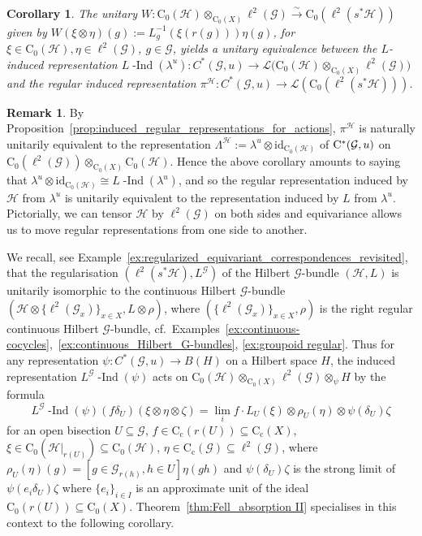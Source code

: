\documentclass[11 pt, leqno]{amsart}
\numberwithin{equation}{section}
\theoremstyle{plain}
\newtheorem{cor}[thm]{Corollary}
\theoremstyle{definition}
\newtheorem {rem} [thm]{Remark}
\newcommand*{\congto}{\xrightarrow\sim}
\newcommand*{\contc}{\mathrm{C_c}}%
\newcommand*{\contz}{\mathrm{C_0}}%
\DeclareMathOperator{\dashind}{-Ind}
\renewcommand{\H}{\mathcal H}
\newcommand{\LL}{\mathcal L}
\newcommand{\G}{\mathcal G} %
\newcommand{\cst}{\ifmmode\mathrm{C}^*\else{$\mathrm{C}^*$}\fi}
\begin{document}
\begin{cor}
The unitary $W\colon \contz(\H)\otimes_{\contz(X)} \ell^2(\G)
\congto \contz(\ell^2(s^*\H))$ given by $W(\xi\otimes\eta)(g):=L_g^{-1}(\xi(r(g)))\eta(g)$, for $\xi \in \contz(\H), \eta \in 
\ell^2(\G)$, $g \in \G$, yields a unitary equivalence between the $L$-induced representation $L\dashind(\lambda^u)\colon C^*(\G,u)\to \LL\big(\contz(\H)\otimes_{\contz(X)} \ell^2(\G)\big)$%
and the regular induced representation $\pi^\H\colon C^*(\G,u)\to \LL(\contz(\ell^2(s^*\H)))$.
\end{cor}

\begin{rem}
By Proposition~\ref{prop:induced_regular_representations_for_actions}, $\pi^{\H}$ is naturally unitarily equivalent to the representation $\Lambda^{\H} := \lambda^u\otimes \mathrm{id}_{\contz(\H)}$ of $\cst(\G,u)$ on  $\contz(\ell^2(\G)) \otimes_{\contz(X)} \contz(\H)$. Hence the above corollary amounts to saying that $\lambda^u\otimes \mathrm{id}_{\contz(\H)}\cong L\dashind(\lambda^u)$, and so the regular representation induced by $\H$ from $\lambda^u$ is unitarily equivalent to the representation induced by $L$ from $\lambda^u$. 
Pictorially,  we can tensor $\H$ by $\ell^2(\G)$ on both sides and equivariance allows us to move regular representations from  one side to another. 
\end{rem}


We recall, see Example~\ref{ex:regularized_equivariant_correspondences_revisited}, that the regularisation $(\ell^2(s^*\H), L^{\G})$ of the Hilbert $\G$-bundle $(\H,L)$ is unitarily isomorphic to the continuous Hilbert $\G$-bundle $(\H\otimes \{\ell^2(\G_x)\}_{x\in X}, L\otimes\rho)$, where  $(\{\ell^2(\G_x)\}_{x\in X},\rho)$ is the right regular continuous Hilbert $\G$-bundle, cf.\  Examples~\ref{ex:continuous-cocycles},~\ref{ex:continuous_Hilbert_G-bundles}, \ref{ex:groupoid regular}.  
Thus for any representation $\psi\colon C^*(\G,u) \to B(H)$ on a Hilbert space $H$, the induced representation $L^\G\dashind(\psi)$ acts  on $\contz(\H)\otimes_{\contz(X)}\ell^2(\G)\otimes_{\psi} H$ by the formula
\[
    L^\G\dashind(\psi)(f\delta_U)(\xi\otimes\eta\otimes\zeta)=\lim_i f\cdot L_U(\xi)\otimes \rho_U(\eta)\otimes \psi(\delta_U)\zeta
\]
for an open bisection $U\subseteq \G$, $f\in \contc(r(U))\subseteq \contc(X)$, $\xi\in \contz(\H|_{r(U)})\subseteq \contz(\H)$, $\eta \in \contc(\G)\subseteq \ell^2(\G)$,
where  $\rho_U(\eta)(g)=[g\in \G_{r(h)}, h\in U] \eta(gh)$ and $\psi(\delta_U)\zeta$ is the strong limit of $\psi(e_i\delta_U)\zeta$ where $\{e_i\}_{i\in I}$ is an approximate unit of the ideal $\contz(r(U))\subseteq \contz(X)$.
Theorem~\ref{thm:Fell_absorption II} specialises in this context to the following corollary.
\end{document}
